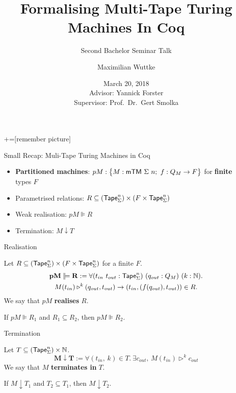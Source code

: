 \documentclass{beamer} %
\title{Formalising Multi-Tape Turing Machines In Coq}
\subtitle{Second Bachelor Seminar Talk}
\author{Maximilian Wuttke}
\institute{Saarland University\\
  \bigskip
  \tiny
  Programming Systems Lab
}
\date{March 20, 2018\\
  \bigskip{}
  \bigskip{}
  {
    \tiny
    Advisor: Yannick Forster\\
    Supervisor: Prof.\ Dr.\ Gert Smolka%
  }
}
\renewcommand{\Nat}{\mathbb{N}}
\begin{document}
+=[remember picture]




\frame{\titlepage}

\begin{frame}{Small Recap: Muli-Tape Turing Machines in Coq}

  \begin{itemize}
  \item \textbf{Partitioned machines}: $pM : \bigl\{ M : \textsf{mTM}~\Sigma~n;~ f : Q_{M} \rightarrow F \bigr \}$ for \textbf{finite} types $F$
  \item Parametrised relations: $R \subseteq (\textsf{Tape}_\Sigma^n) \times (F \times \textsf{Tape}_\Sigma^n)$
  \item Weak realisation: $pM \VDash R$
  \item Termination: $M \downarrow T$
  \end{itemize}

\end{frame}

\begin{frame}{Realisation}

  \begin{definition}
    Let $R \subseteq (\textsf{Tape}_\Sigma^n) \times (F \times \textsf{Tape}_\Sigma^n)$ for a finite $F$.
    \begin{multline*}
      \mathbf{pM \VDash R} :=
      \forall (t_{in}~t_{out} : \Tape_\Sigma^n)~(q_{out}:Q_M)~(k:\Nat). \\
      M(t_{in}) \triangleright^k (q_{out}, t_{out}) \rightarrow
      \left(t_{in}, \left(f(q_{out}), t_{out} \right) \right) \in R.
    \end{multline*}
    We say that $pM$ \textbf{realises} $R$.
  \end{definition}

  \begin{lemma}
    If $pM \VDash R_1$ and $R_1 \subseteq R_2$, then $pM \VDash R_2$.
  \end{lemma}

\end{frame}

\begin{frame}{Termination}

  \begin{definition}
    Let $T \subseteq (\Tape_\Sigma^n) \times \Nat$.
    \[
      \mathbf{M \downarrow T} :=
      \forall (t_{in},~k) \in T.~
      \exists c_{out},~M(t_{in}) \triangleright^k c_{out}
    \]
    We say that $M$ \textbf{terminates in} $T$.
  \end{definition}

  \begin{lemma}
    If $M \downarrow T_1$ and $T_2 \subseteq T_1$, then $M \downarrow T_2$.
  \end{lemma}

\end{frame}
\end{document}
